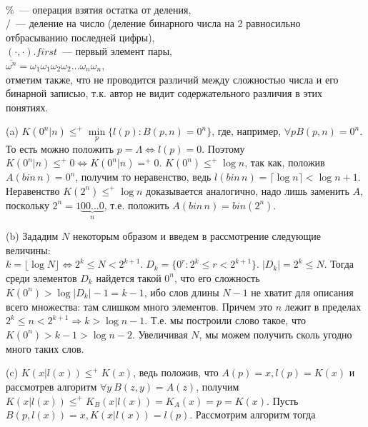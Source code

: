 
{\bfseries {}}\\
\%~--- операция взятия остатка от деления, \\
/~--- деление на число (деление бинарного числа на 2 равносильно отбрасыванию последней цифры), \\
$(\cdot,\cdot).first$~--- первый элемент пары,\\
$\overline{\omega^n} = \omega_1\omega_1\omega_2\omega_2\ldots \omega_n\omega_n$, \\
отметим также, что не проводится различий между сложностью числа и его бинарной записью, т.к. автор не видит содержательного различия в этих понятиях. 

(a) $K(0^n|n)\le^+\min\limits_p\{l(p) \colon B(p,n)=0^n\}$, где, например, $ \forall p B(p,n)=0^n$. То есть можно положить $p=\Lambda \Leftrightarrow l(p)=0$. Поэтому   $K(0^n|n)\le^+0 \Leftrightarrow K(0^n|n)=^+0$.
$K(0^n)\le^+\log n$, так как, положив $A(bin\,n)=0^n$, получим то неравенство, ведь $l(bin \, n) = \lceil\log n\rceil <\log n +1$. 
Неравенство $K(2^n)\le^+\log n$ доказывается аналогично, надо лишь заменить $A$, поскольку $2^n=1\underbrace{00\ldots0}_n$, т.е. положить $A(bin\,n)=bin(2^n)$.

(b) Зададим $N$ некоторым образом и введем в рассмотрение следующие величины: $k=\lfloor\log N\rfloor \Leftrightarrow 2^k\le N < 2^{k+1}.\;
		D_k=\{0^r\colon 2^k\le r < 2^{k+1}\}.\; |D_k|=2^k\le N.$ Тогда среди элементов $D_k$ найдется такой $0^n$, что его сложность $K(0^n)> \log |D_k|-1=k-1$, ибо слов длины $N-1$ не хватит для описания всего множества: там слишком много элементов. Причем это $n$ лежит в пределах $2^k\le n < 2^{k+1} \Rightarrow k  > \log n -1$. Т.е. мы построили слово такое, что $K(0^n)>k-1>\log n -2$. Увеличивая $N$, мы можем получить сколь угодно много таких слов. 
		
(c) $K(x|l(x))\le^+K(x)$, ведь положив, что $A(p)=x, l(p)=K(x)$ и рассмотрев алгоритм $\forall y \: B(z,y)=A(z)$, получим $K(x|l(x))\le^+K_B(x|l(x))=K_A(x)=p=K(x)$.
Пусть $B(p,l(x))=x, K(x|l(x))=l(p).$ Рассмотрим алгоритм 
тогда 


